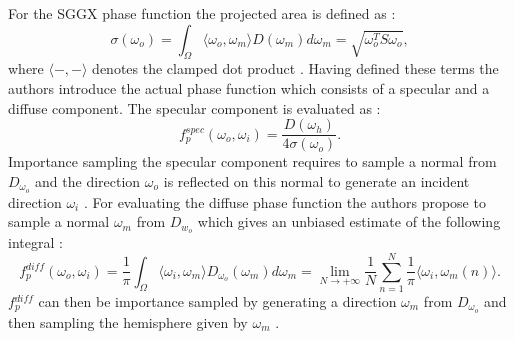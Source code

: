 For the SGGX phase function the projected area is defined as \cite{sggx}:
\begin{equation}
    \label{eq:projected_area}
    \sigma(\omega_o)=\int_\Omega \langle \omega_o, \omega_m \rangle D(\omega_m) d\omega_m = \sqrt{\omega_o^T S \omega_o},
\end{equation}
where $\langle -,-\rangle$ denotes the clamped dot product \cite{sggx}.
Having defined these terms the authors introduce the actual phase function which consists of a specular and a diffuse component.
The specular component is evaluated as \cite{sggx}:
\begin{equation}
    f{}^{spec}_p(\omega_o, \omega_i) = \frac{D(\omega_h)}{4 \sigma(\omega_o)}.
\end{equation}
Importance sampling the specular component requires to sample a normal from $D_{\omega_o}$ and the direction $\omega_o$ is reflected on this normal to generate an incident direction $\omega_i$ \cite{sggx}.
For evaluating the diffuse phase function the authors propose to sample a normal $\omega_m$ from $D_{w_o}$ which gives an unbiased estimate of the following integral \cite{sggx}:
\begin{equation}
    f{}^{diff}_p(\omega_o, \omega_i) = \frac{1}{\pi}\int_\Omega \langle\omega_i,\omega_m\rangle D_{\omega_o}(\omega_m) d\omega_m = \lim \limits_{N \to +\infty} \frac{1}{N} \sum_{n=1}^N \frac{1}{\pi} \langle\omega_i,\omega_m(n)\rangle.
\end{equation}
$f{}^{diff}_p$ can then be importance sampled by generating a direction $\omega_m$ from $D_{\omega_o}$ and then sampling the hemisphere given by $\omega_m$ \cite{sggx}.

